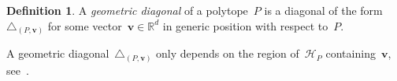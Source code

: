 \documentclass{amsart}
\newcommand{\darkblue}{\color{darkblue}} %
\theoremstyle{definition}
\newtheorem{definition}[theorem]{Definition}
\newcommand{\R}{\mathbb{R}} %
\renewcommand{\b}[1]{{\boldsymbol{#1}}} %
\newcommand{\defn}[1]{\textsl{\darkblue #1}} %
\renewcommand{\b}[1]{\boldsymbol{#1}} %
\begin{document}
\begin{definition}
    A \defn{geometric diagonal} of a polytope~$P$ is a diagonal of the form~$\triangle_{(P,\b{v})}$ for some vector~$\b{v} \in \R^d$ in generic position with respect to~$P$.
\end{definition}

A geometric diagonal~$\triangle_{(P,\b{v})}$ only depends on the region of~$\mathcal{H}_P$ containing~$\b{v}$, see~\cite[Prop.~1.23]{LA21}.

\begin{figure}[p]
	\centerline{}
\end{figure}
\end{document}
